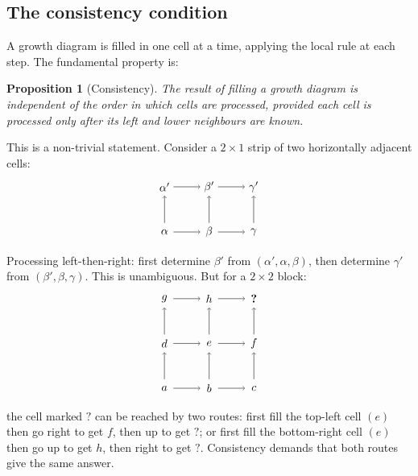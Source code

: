 \documentclass[12pt,a4paper]{article}
\newtheorem{proposition}[theorem]{Proposition}
\theoremstyle{definition}
\theoremstyle{remark}
\begin{document}
\subsection{The consistency condition}

A growth diagram is filled in one cell at a time, applying the local
rule at each step. The fundamental property is:

\begin{proposition}[Consistency]
\label{prop:consistency}
The result of filling a growth diagram is independent of the order in
which cells are processed, provided each cell is processed only after
its left and lower neighbours are known.
\end{proposition}

This is a non-trivial statement. Consider a $2 \times 1$ strip of two
horizontally adjacent cells:
\[
\begin{tikzpicture}[scale=1.4]
  \node at (0,0) {$\alpha$};
  \node at (1,0) {$\beta$};
  \node at (2,0) {$\gamma$};
  \node at (0,1) {$\alpha'$};
  \node at (1,1) {$\beta'$};
  \node at (2,1) {$\gamma'$};
  \draw[->] (0.2,0) -- (0.8,0);
  \draw[->] (1.2,0) -- (1.8,0);
  \draw[->] (0.2,1) -- (0.8,1);
  \draw[->] (1.2,1) -- (1.8,1);
  \draw[->] (0,0.2) -- (0,0.8);
  \draw[->] (1,0.2) -- (1,0.8);
  \draw[->] (2,0.2) -- (2,0.8);
\end{tikzpicture}
\]
Processing left-then-right: first determine $\beta'$ from
$(\alpha', \alpha, \beta)$, then determine $\gamma'$ from
$(\beta', \beta, \gamma)$. This is unambiguous. But for a $2 \times 2$
block:
\[
\begin{tikzpicture}[scale=1.4]
  \node at (0,0) {$a$};
  \node at (1,0) {$b$};
  \node at (2,0) {$c$};
  \node at (0,1) {$d$};
  \node at (1,1) {$e$};
  \node at (2,1) {$f$};
  \node at (0,2) {$g$};
  \node at (1,2) {$h$};
  \node at (2,2) {$\boldsymbol{?}$};
  \draw[->] (0.2,0) -- (0.8,0);
  \draw[->] (1.2,0) -- (1.8,0);
  \draw[->] (0.2,1) -- (0.8,1);
  \draw[->] (1.2,1) -- (1.8,1);
  \draw[->] (0.2,2) -- (0.8,2);
  \draw[->] (1.2,2) -- (1.8,2);
  \draw[->] (0,0.2) -- (0,0.8);
  \draw[->] (1,0.2) -- (1,0.8);
  \draw[->] (2,0.2) -- (2,0.8);
  \draw[->] (0,1.2) -- (0,1.8);
  \draw[->] (1,1.2) -- (1,1.8);
  \draw[->] (2,1.2) -- (2,1.8);
\end{tikzpicture}
\]
the cell marked $\boldsymbol{?}$ can be reached by two routes: first
fill the top-left cell $(e)$ then go right to get $f$, then up to get
$\boldsymbol{?}$; or first fill the bottom-right cell $(e)$ then go up
to get $h$, then right to get $\boldsymbol{?}$. Consistency demands
that both routes give the same answer.
\end{document}
